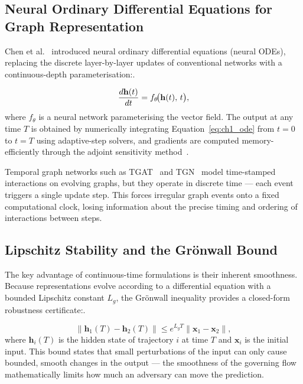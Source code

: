 \label{sec:ct_dynamics}%

\subsection{Neural Ordinary Differential Equations for Graph Representation}

Chen et al.~\cite{Chen2018} introduced neural ordinary differential equations (neural ODEs), replacing the discrete layer-by-layer updates of conventional networks with a continuous-depth parameterisation:.

\begin{equation}
\frac{d\mathbf{h}(t)}{dt} = f_\theta\!\bigl(\mathbf{h}(t),\, t\bigr),
\label{eq:ch1_ode}
\end{equation}where $f_\theta$ is a neural network parameterising the vector field. The output at any time $T$ is obtained by numerically integrating Equation~\eqref{eq:ch1_ode} from $t=0$ to $t=T$ using adaptive-step solvers, and gradients are computed memory-efficiently through the adjoint sensitivity method~\cite{Pontryagin1962}.

Temporal graph networks such as TGAT~\cite{Xu2020tgat} and TGN~\cite{Rossi2020} model time-stamped interactions on evolving graphs, but they operate in discrete time --- each event triggers a single update step. This forces irregular graph events onto a fixed computational clock, losing information about the precise timing and ordering of interactions between steps.

\subsection{Lipschitz Stability and the Gr\"{o}nwall Bound}

The key advantage of continuous-time formulations is their inherent smoothness. Because representations evolve according to a differential equation with a bounded Lipschitz constant $L_g$, the Gr\"{o}nwall inequality provides a closed-form robustness certificate:.

\begin{equation}
\|\mathbf{h}_1(T) - \mathbf{h}_2(T)\| \leq e^{L_g T}\|\mathbf{x}_1 - \mathbf{x}_2\|,
\label{eq:ch1_gronwall}
\end{equation}where $\mathbf{h}_i(T)$ is the hidden state of trajectory $i$ at time $T$ and $\mathbf{x}_i$ is the initial input. This bound states that small perturbations of the input can only cause bounded, smooth changes in the output --- the smoothness of the governing flow mathematically limits how much an adversary can move the prediction.


